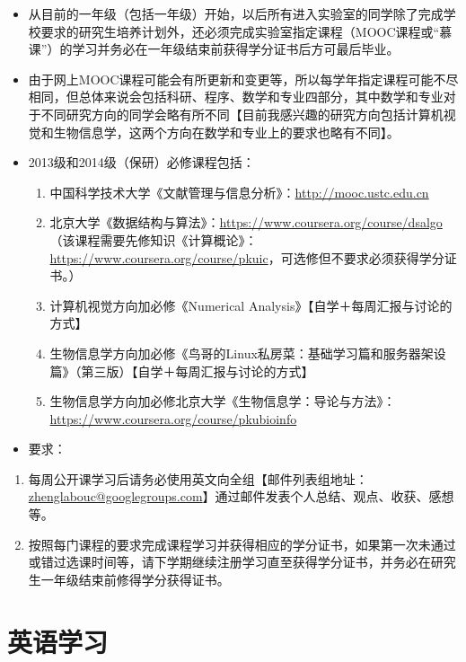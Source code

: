 \documentclass[a4paper，12pt]{article}
\begin{document}
\begin{itemize}

\item 从目前的一年级（包括一年级）开始，以后所有进入实验室的同学除了完成学校要求的研究生培养计划外，还必须完成实验室指定课程（MOOC课程或“慕课”）的学习并务必在一年级结束前获得学分证书后方可最后毕业。

\item 由于网上MOOC课程可能会有所更新和变更等，所以每学年指定课程可能不尽相同，但总体来说会包括科研、程序、数学和专业四部分，其中数学和专业对于不同研究方向的同学会略有所不同【目前我感兴趣的研究方向包括计算机视觉和生物信息学，这两个方向在数学和专业上的要求也略有不同】。

\item 2013级和2014级（保研）必修课程包括：

\begin{enumerate}
\item 中国科学技术大学《文献管理与信息分析》：\url{http://mooc.ustc.edu.cn}
\item 北京大学《数据结构与算法》：\url{https://www.coursera.org/course/dsalgo} （该课程需要先修知识《计算概论》：\url{https://www.coursera.org/course/pkuic}，可选修但不要求必须获得学分证书。）
\item 计算机视觉方向加必修《Numerical Analysis》【自学＋每周汇报与讨论的方式】
\item 生物信息学方向加必修《鸟哥的Linux私房菜：基础学习篇和服务器架设篇》（第三版）【自学＋每周汇报与讨论的方式】
\item 生物信息学方向加必修北京大学《生物信息学：导论与方法》：\url{https://www.coursera.org/course/pkubioinfo}
\end{enumerate}

\item 要求：

\end{itemize}

\begin{enumerate}
\item 每周公开课学习后请务必使用英文向全组【邮件列表组地址：\url{zhenglabouc@googlegroups.com}】通过邮件发表个人总结、观点、收获、感想等。
\item 按照每门课程的要求完成课程学习并获得相应的学分证书，如果第一次未通过或错过选课时间等，请下学期继续注册学习直至获得学分证书，并务必在研究生一年级结束前修得学分获得证书。
\end{enumerate}

\section{英语学习}
\end{document}
